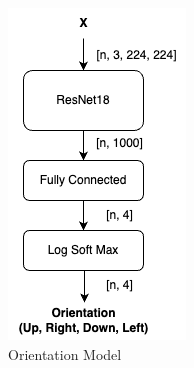 \begin{figure}[htbp]
    \centering
    \begin{subfigure}{0.2\linewidth}
        \centering
        \includegraphics[width=\linewidth]{images/OrientationModel.png}
        \caption{Orientation Model}
        \label{fig:orientation_model}
    \end{subfigure}
    \begin{subfigure}{0.2\linewidth}

\end{subfigure}
\end{figure}
